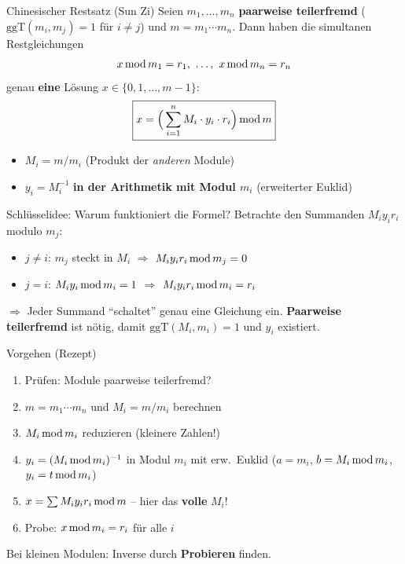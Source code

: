 \documentclass[a4paper, fontsize=7pt]{scrartcl}
\newcommand{\Mod}{\mskip3mu\mathrm{mod}\mskip3mu}
\begin{document}
\begin{mainbox}{Chinesischer Restsatz (Sun Zi)}
Seien $m_1, \ldots, m_n$ \textbf{paarweise teilerfremd}
($\mathrm{ggT}(m_i,m_j) = 1$ für $i \neq j$) und $m = m_1 \cdots m_n$.
Dann haben die simultanen Restgleichungen
$$x \Mod m_1 = r_1,\ \ldots,\ x \Mod m_n = r_n$$
genau \textbf{eine} Lösung $x \in \{0, 1, \ldots, m-1\}$:
$$\boxed{x = \Big(\sum_{i=1}^n M_i \cdot y_i \cdot r_i\Big) \Mod m}$$
\begin{itemize}
    \item $M_i = m / m_i$ (Produkt der \emph{anderen} Module)
    \item $y_i = M_i^{-1}$ \textbf{in der Arithmetik mit Modul $m_i$}
          (erweiterter Euklid)
\end{itemize}
\end{mainbox}

\begin{subbox}{Schlüsselidee: Warum funktioniert die Formel?}
Betrachte den Summanden $M_i y_i r_i$ modulo $m_j$:
\begin{itemize}
    \item $j \neq i$: $m_j$ steckt in $M_i$ $\Rightarrow$
          $M_i y_i r_i \Mod m_j = 0$
    \item $j = i$: $M_i y_i \Mod m_i = 1$ $\Rightarrow$
          $M_i y_i r_i \Mod m_i = r_i$
\end{itemize}
$\Rightarrow$ Jeder Summand ``schaltet'' genau eine Gleichung ein.
\textbf{Paarweise teilerfremd} ist nötig, damit
$\mathrm{ggT}(M_i, m_i) = 1$ und $y_i$ existiert.
\end{subbox}

\begin{mainbox}{Vorgehen (Rezept)}
\begin{enumerate}
    \item Prüfen: Module paarweise teilerfremd?
    \item $m = m_1 \cdots m_n$ und $M_i = m/m_i$ berechnen
    \item $M_i \Mod m_i$ reduzieren (kleinere Zahlen!)
    \item $y_i = (M_i \Mod m_i)^{-1}$ in Modul $m_i$ mit erw.\
          Euklid ($a = m_i$, $b = M_i \Mod m_i$, $y_i = t \Mod m_i$)
    \item $x = \sum M_i y_i r_i \Mod m$ -- hier das \textbf{volle} $M_i$!
    \item Probe: $x \Mod m_i = r_i$ für alle $i$
\end{enumerate}
Bei kleinen Modulen: Inverse durch \textbf{Probieren} finden.
\end{mainbox}
\end{document}
